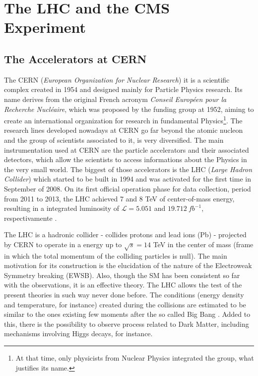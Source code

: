 \chapter{The LHC and the CMS Experiment}

\section{The Accelerators at CERN}
The CERN (\textit{European Organization for Nuclear Research}) it is a scientific complex created in 1954 and designed mainly for Particle Physics research. Its name derives from the original French acronym \textit{Conseil Européen pour la Recherche Nucléaire}, which was proposed by the funding group at 1952, aiming to create an international organization for research in fundamental Physics\footnote{At that time, only physicists from Nuclear Physics integrated the group, what justifies its name.}. The research lines developed nowadays at CERN go far beyond the atomic nucleon and the group of scientists associated to it, is very diversified. The main instrumentation used at CERN are the particle accelerators and their associated detectors, which allow the scientists to access informations about the Physics in the very small world. The biggest of those accelerators is the LHC (\textit{Large Hadron Collider}) which started to be built in 1994 and was activated for the first time in September of 2008. On its first official operation phase for data collection, period from 2011 to 2013, the LHC achieved 7 and 8 TeV of center-of-mass energy, resulting in a integrated luminosity of $\mathcal{L} = 5.051$ and $19.712~fb^{-1}$, respectivamente \cite{bib:web-cern}.

The LHC is a hadronic collider - collides protons and lead ions (Pb) - projected by CERN to operate in a energy up to $\sqrt{s}=14$ TeV in the center of mass (frame in which the total momentum of the colliding particles is null). The main motivation for its construction is the elucidation of the nature of the Electroweak Symmetry breaking (EWSB). Also, though the SM has been consistent so far with the observations, it is an effective theory. The LHC allows the test of the present theories in such way never done before. The conditions (energy density and temperature, for instance) created during the collisions are estimated to be similar to the ones existing few moments after the so called Big Bang \cite{bib:lhc-guide}. Added to this, there is the possibility to observe process related to Dark Matter, including mechanisms involving Higgs decays, for instance. 


